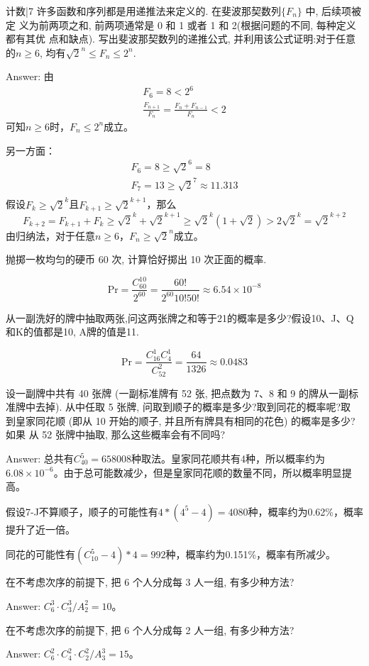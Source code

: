 \newChapter 计数\uppercase\expandafter{}|7
\exer 许多函数和序列都是用递推法来定义的. 在斐波那契数列$\{F_n\}$ 中, 后续项被定 义为前两项之和, 前两项通常是 0 和 1 或者 1 和 2(根据问题的不同, 每种定义都有其优 点和缺点). 写出斐波那契数列的递推公式, 并利用该公式证明:对于任意的$n\ge 6$, 均有$\sqrt{2}^n \le F_n\le 2^n$.\par
Answer: 由
\begin{gather*}
F_6= 8 < 2^6 \\
\frac{F_{n+1}}{F_n}=\frac{F_{n}+F_{n-1}}{F_n} < 2 
\end{gather*}
可知$n\ge 6$时，$F_n\le 2^n$成立。\par
另一方面：
\begin{gather*}
F_6=8\ge \sqrt2^6=8 \\
F_7=13\ge \sqrt2^7\approx 11.313 \\
\end{gather*}
假设$F_k\ge\sqrt2^k$且$F_{k+1}\ge\sqrt2^{k+1}$，那么
\[F_{k+2}=F_{k+1}+F_k\ge\sqrt2^k+\sqrt2^{k+1}\ge\sqrt2^k(1+\sqrt2)>2\sqrt2^k=\sqrt2^{k+2}\]
由归纳法，对于任意$n\ge 6$，$F_n\ge \sqrt2^n$成立。

\exer 抛掷一枚均匀的硬币 60 次, 计算恰好掷出 10 次正面的概率.\par
\[\mathrm{Pr}=\frac{C_60^10}{2^{60}}=\frac{60!}{2^{60}10!50!}\approx 6.54\times 10^{-8}\]

\exer 从一副洗好的牌中抽取两张,问这两张牌之和等于21的概率是多少?假设10、J、Q和K的值都是10, A牌的值是11.\par
\[\mathrm{Pr}=\frac{C_{16}^1C_4^1}{C_52^2}=\frac{64}{1326}\approx 0.0483\]

\exer 设一副牌中共有 40 张牌 (一副标准牌有 52 张, 把点数为 7、8 和 9 的牌从一副标准牌中去掉). 从中任取 5 张牌, 问取到顺子的概率是多少?取到同花的概率呢?取 到皇家同花顺 (即从 10 开始的顺子, 并且所有牌具有相同的花色) 的概率是多少?如果 从 52 张牌中抽取, 那么这些概率会有不同吗?\par
Answer: 总共有$C_{40}^5=658008$种取法。皇家同花顺共有4种，所以概率约为$6.08\times10^{-6}$。由于总可能数减少，但是皇家同花顺的数量不同，所以概率明显提高。\par
假设7-J不算顺子，顺子的可能性有$4*(4^5-4)=4080$种，概率约为0.62\%，概率提升了近一倍。\par
同花的可能性有$(C_{10}^5-4)*4=992$种，概率约为0.151\%，概率有所减少。

\exer 在不考虑次序的前提下, 把 6 个人分成每 3 人一组, 有多少种方法?\par
Answer: $C_6^3\cdot C_3^3 / A_2^2=10$。

\exer 在不考虑次序的前提下, 把 6 个人分成每 2 人一组, 有多少种方法?\par
Answer: $C_6^2\cdot C_4^2\cdot C_2^2 / A_3^3=15$。